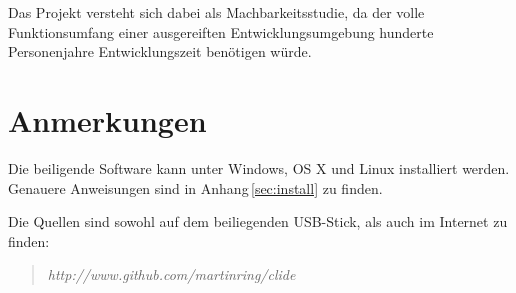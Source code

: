 Das Projekt versteht sich dabei als Machbarkeitsstudie, da der volle Funktionsumfang einer
ausgereiften Entwicklungsumgebung hunderte Personenjahre Entwicklungszeit benötigen würde.

\section{Anmerkungen}

Die beiligende Software kann unter Windows, OS X und Linux installiert werden. Genauere
Anweisungen sind in Anhang\,\ref{sec:install} zu finden.

Die Quellen sind sowohl auf dem beiliegenden USB-Stick, als auch im Internet zu finden:

\begin{quote}
\textit{http://www.github.com/martinring/clide}
\end{quote}